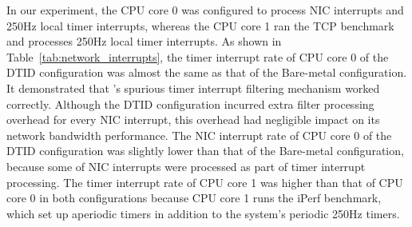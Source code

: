 In our experiment, the CPU core 0 was configured to process
NIC interrupts and 250Hz local timer interrupts, whereas the
CPU core 1 ran the TCP benchmark and processes 250Hz local
timer interrupts. As shown in
Table~\ref{tab:network_interrupts}, the timer interrupt rate
of CPU core 0 of the DTID configuration was almost the same as
that of the Bare-metal configuration. It demonstrated that
\sna's spurious timer interrupt filtering mechanism worked
correctly. Although the DTID configuration incurred extra
filter processing overhead for every NIC interrupt, this
overhead had negligible impact on its network bandwidth
performance. The NIC interrupt rate of CPU core 0 of the DTID
configuration was slightly lower than that of the Bare-metal
configuration, because some of NIC interrupts were processed
as part of timer interrupt processing. The timer interrupt
rate of CPU core 1 was higher than that of CPU core 0 in both
configurations because CPU core 1 runs the iPerf benchmark,
which set up aperiodic timers in addition to the system's
periodic 250Hz timers.



